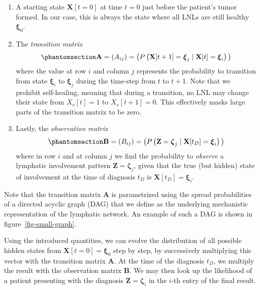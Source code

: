 \documentclass[
  sn-mathphys-num,
]{sn-jnl}
\providecommand{\tightlist}{%
  \setlength{\itemsep}{0pt}\setlength{\parskip}{0pt}}\usepackage{longtable,booktabs,array}
\begin{document}
\begin{enumerate}
\def\labelenumi{\arabic{enumi}.}
\tightlist
\item
  A starting state \(\mathbf{X}[t=0]\) at time \(t=0\) just before the
  patient's tumor formed. In our case, this is always the state where
  all LNLs are still healthy \(\boldsymbol{\xi}_0\).
\item
  The \emph{transition matrix}
  \begin{equation}\phantomsection\label{eq-trans-matrix}{
  \mathbf{A} = \left( A_{ij} \right) = \big( P \left( \mathbf{X}[t+1] = \boldsymbol{\xi}_j \mid \mathbf{X}[t] = \boldsymbol{\xi}_i \right) \big)
  }\end{equation} where the value at row \(i\) and column \(j\)
  represents the probability to transition from state
  \(\boldsymbol{\xi}_i\) to \(\boldsymbol{\xi}_j\) during the time-step
  from \(t\) to \(t+1\). Note that we prohibit self-healing, meaning
  that during a transition, no LNL may change their state from
  \(X_v[t]=1\) to \(X_v[t+1]=0\). This effectively masks large parts of
  the transition matrix to be zero.
\item
  Lastly, the \emph{observation matrix}
  \begin{equation}\phantomsection\label{eq-obs-matrix}{
  \mathbf{B} = \left( B_{ij} \right) = \big( P \left( \mathbf{Z} = \boldsymbol{\zeta}_j \mid \mathbf{X}[t_D] = \boldsymbol{\xi}_i \right) \big)
  }\end{equation} where in row \(i\) and at column \(j\) we find the
  probability to \emph{observe} a lymphatic involvement pattern
  \(\mathbf{Z} = \boldsymbol{\zeta}_j\), given that the true (but
  hidden) state of involvement at the time of diagnosis \(t_D\) is
  \(\mathbf{X}[t_D] = \boldsymbol{\xi}_i\).
\end{enumerate}

Note that the transition matrix \(\mathbf{A}\) is parametrized using the
spread probabilities of a directed acyclic graph (DAG) that we define as
the underlying mechanistic representation of the lymphatic network. An
example of such a DAG is shown in figure~\ref{fig-small-graph}.

Using the introduced quantities, we can evolve the distribution of all
possible hidden states from \(\mathbf{X}[t=0] = \boldsymbol{\xi}_0\)
step by step, by successively multiplying this vector with the
transition matrix \(\mathbf{A}\). At the time of the diagnosis \(t_D\),
we multiply the result with the observation matrix \(\mathbf{B}\). We
may then look up the likelihood of a patient presenting with the
diagnosis \(\mathbf{Z}=\boldsymbol{\zeta}_i\) in the \(i\)-th entry of
the final result.
\end{document}
